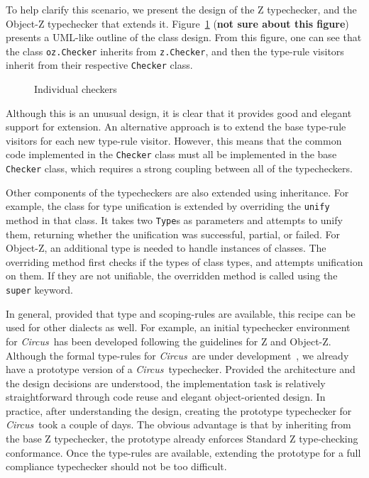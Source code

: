 \documentclass{llncs}
\newcommand{\Circus}{{\sf\slshape Circus}}
\begin{document}
To help clarify this scenario, we present the design of the Z typechecker, and the
Object-Z typechecker that extends it. Figure~\ref{tc-design} ({\bf not sure about this figure})
presents a UML-like outline of the class design. From this figure, one can see
that the class {\tt oz.Checker} inherits from {\tt z.Checker}, and then the type-rule visitors
inherit from their respective {\tt Checker} class.
%
\def\epsfsize#1#2{0.70#1}
\begin{figure}[t]
\begin{center}
\caption{Individual checkers}\label{tc-design}
\end{center}
\end{figure}
\def\epsfsize#1#2{\epsfxsize}
%
Although this is an unusual design, it is clear that it provides good and elegant support for extension.
An alternative approach is to extend the base type-rule visitors for each new type-rule visitor.
However, this means that the common code implemented in the {\tt Checker} class must all be
implemented in the base {\tt Checker} class, which requires a strong coupling between
all of the typecheckers.

Other components of the typecheckers are also extended using inheritance.
For example, the class for type unification is extended by overriding the {\tt unify} method in that class.
It takes two {\tt Type}s as parameters and attempts to unify them, returning whether the unification
was successful, partial, or failed.
For Object-Z, an additional type is needed to handle instances of classes.
The overriding method first checks if the types of class types, and attempts unification on them.
If they are not unifiable, the overridden method is called using the {\tt super} keyword.

In general, provided that type and scoping-rules are available, this recipe
can be used for other dialects as well.
For example, an initial typechecker environment for \Circus\ has been developed following
the guidelines for Z and Object-Z. Although the formal type-rules for \Circus\ are under
development~\cite{circus.other:typechecker}, we already have a prototype version of a \Circus\ typechecker.
Provided the architecture and the design decisions are understood, the implementation task is relatively
straightforward through code reuse and elegant object-oriented design.
In practice, after understanding the design, creating the prototype typechecker for \Circus\ took a couple
of days. The obvious advantage is that by inheriting from the base Z typechecker, the prototype already enforces
Standard Z type-checking conformance. Once the type-rules are available, extending the prototype for
a full compliance typechecker should not be too difficult.
\end{document}
